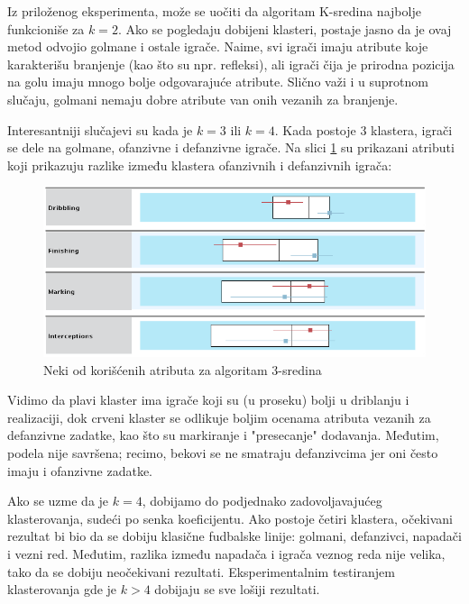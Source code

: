 \documentclass[a4paper]{article}
\begin{document}
Iz priloženog eksperimenta, može se uočiti da algoritam K-sredina najbolje funkcioniše za $ k = 2 $. Ako se pogledaju dobijeni klasteri, postaje jasno da je ovaj metod odvojio golmane i ostale igrače. Naime, svi igrači imaju atribute koje karakterišu branjenje (kao što su npr. refleksi), ali igrači čija je prirodna pozicija na golu imaju mnogo bolje odgovarajuće atribute. Slično važi i u suprotnom slučaju, golmani nemaju dobre atribute van onih vezanih za branjenje.

Interesantniji slučajevi su kada je $ k = 3 $ ili $ k = 4 $. Kada postoje 3 klastera, igrači se dele na golmane, ofanzivne i defanzivne igrače. Na slici \ref{fig:3means_attributes} su prikazani atributi koji prikazuju razlike između klastera ofanzivnih i defanzivnih igrača:

\begin{figure}[h!]
\begin{center}
\includegraphics[width=\textwidth]{images/3means_attributes.png}
\end{center}
\caption{Neki od korišćenih atributa za algoritam 3-sredina}
\label{fig:3means_attributes}
\end{figure}

Vidimo da plavi klaster ima igrače koji su (u proseku) bolji u driblanju i realizaciji, dok crveni klaster se odlikuje boljim ocenama atributa vezanih za defanzivne zadatke, kao što su markiranje i "presecanje" dodavanja. Međutim, podela nije savršena; recimo, bekovi se ne smatraju defanzivcima jer oni često imaju i ofanzivne zadatke.

Ako se uzme da je $ k = 4 $, dobijamo do podjednako zadovoljavajućeg klasterovanja, sudeći po senka koeficijentu. Ako postoje četiri klastera, očekivani rezultat bi bio da se dobiju klasične fudbalske linije: golmani, defanzivci, napadači i vezni red. Međutim, razlika između napadača i igrača veznog reda nije velika, tako da se dobiju neočekivani rezultati. Eksperimentalnim testiranjem klasterovanja gde je $ k > 4 $ dobijaju se sve lošiji rezultati.
\end{document}
